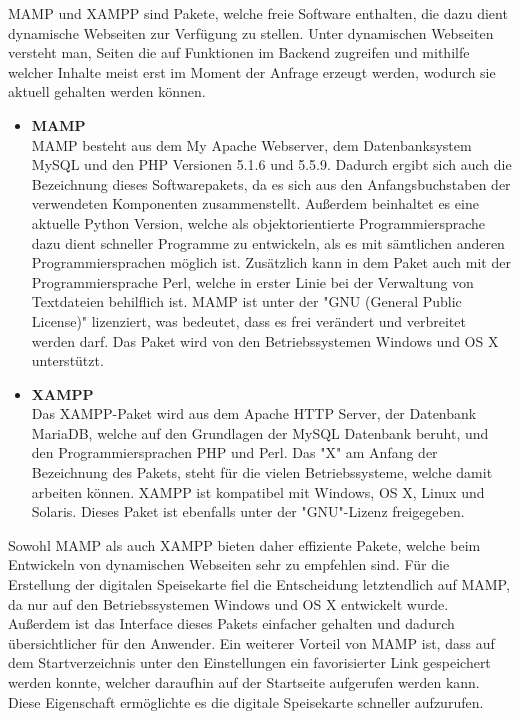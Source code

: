 {MAMP\cite{mamp}} und {XAMPP\cite{xampp}} sind Pakete, welche freie Software enthalten, die dazu dient dynamische Webseiten zur Verfügung zu stellen. Unter dynamischen Webseiten versteht man, Seiten die auf Funktionen im Backend zugreifen und mithilfe welcher Inhalte meist erst im Moment der Anfrage erzeugt werden, wodurch sie aktuell gehalten werden können.
\begin{itemize}
    \item \textbf{MAMP}\\
MAMP besteht aus dem My Apache Webserver, dem Datenbanksystem MySQL und den PHP Versionen 5.1.6 und 5.5.9. Dadurch ergibt sich auch die Bezeichnung dieses Softwarepakets, da es sich aus den Anfangsbuchstaben der verwendeten Komponenten zusammenstellt. Außerdem beinhaltet es eine aktuelle {Python\cite{python}} Version, welche als objektorientierte Programmiersprache dazu dient schneller Programme zu entwickeln, als es mit sämtlichen anderen Programmiersprachen möglich ist. Zusätzlich kann in dem Paket auch mit der Programmiersprache {Perl\cite{perl}}, welche in erster Linie bei der Verwaltung von Textdateien behilflich ist. MAMP ist unter der "{GNU\cite{gnu}} (General Public License)" lizenziert, was bedeutet, dass es frei verändert und verbreitet werden darf. Das Paket wird von den Betriebssystemen Windows und OS X unterstützt.
    \item \textbf{XAMPP}\\
Das XAMPP-Paket wird aus dem Apache HTTP Server, der Datenbank MariaDB, welche auf den Grundlagen der MySQL Datenbank beruht, und den Programmiersprachen PHP und Perl. Das "X" am Anfang der Bezeichnung des Pakets, steht für die vielen Betriebssysteme, welche damit arbeiten können. XAMPP ist kompatibel mit Windows, OS X, Linux und Solaris. Dieses Paket ist ebenfalls unter der "GNU"-Lizenz freigegeben.
  \end{itemize}
Sowohl MAMP als auch XAMPP bieten daher effiziente Pakete, welche beim Entwickeln von dynamischen Webseiten sehr zu empfehlen sind. Für die Erstellung der digitalen Speisekarte fiel die Entscheidung letztendlich auf MAMP, da nur auf den Betriebssystemen Windows und OS X entwickelt wurde. Außerdem ist das Interface dieses Pakets einfacher gehalten und dadurch übersichtlicher für den Anwender. Ein weiterer Vorteil von MAMP ist, dass auf dem Startverzeichnis unter den Einstellungen ein favorisierter Link gespeichert werden konnte, welcher daraufhin auf der Startseite aufgerufen werden kann. Diese Eigenschaft ermöglichte es die digitale Speisekarte schneller aufzurufen.

